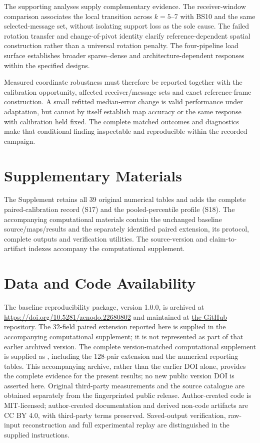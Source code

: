 \documentclass[11pt,a4paper]{article}
\begin{document}
The supporting analyses supply complementary evidence. The receiver-window comparison associates the local transition across $k=5$--7 with BS10 and the same selected-message set, without isolating support loss as the sole cause. The failed rotation transfer and change-of-pivot identity clarify reference-dependent spatial construction rather than a universal rotation penalty. The four-pipeline load surface establishes broader sparse--dense and architecture-dependent responses within the specified designs.

Measured coordinate robustness must therefore be reported together with the calibration opportunity, affected receiver/message sets and exact reference-frame construction. A small refitted median-error change is valid performance under adaptation, but cannot by itself establish map accuracy or the same response with calibration held fixed. The complete matched outcomes and diagnostics make that conditional finding inspectable and reproducible within the recorded campaign.

\section*{Supplementary Materials}
The Supplement retains all 39 original numerical tables and adds the complete paired-calibration record (S17) and the pooled-percentile profile (S18). The accompanying computational materials contain the unchanged baseline source/maps/results and the separately identified paired extension, its protocol, complete outputs and verification utilities. The source-version and claim-to-artifact indexes accompany the computational supplement.

\section*{Data and Code Availability}
The baseline reproducibility package, version 1.0.0, is archived at \url{https://doi.org/10.5281/zenodo.22680802} \cite{baseline_archive} and maintained at \href{https://github.com/anantarj/receiver-coordinate-error-robustness-rssi-localization}{the GitHub repository}. The 32-field paired extension reported here is supplied in the accompanying computational supplement; it is not represented as part of that earlier archived version. The complete version-matched computational supplement is supplied as , including the 128-pair extension and the numerical reporting tables. This accompanying archive, rather than the earlier DOI alone, provides the complete evidence for the present results; no new public version DOI is asserted here. Original third-party measurements and the source catalogue are obtained separately from the fingerprinted public release. Author-created code is MIT-licensed; author-created documentation and derived non-code artifacts are CC BY 4.0, with third-party terms preserved. Saved-output verification, raw-input reconstruction and full experimental replay are distinguished in the supplied instructions.
\end{document}
